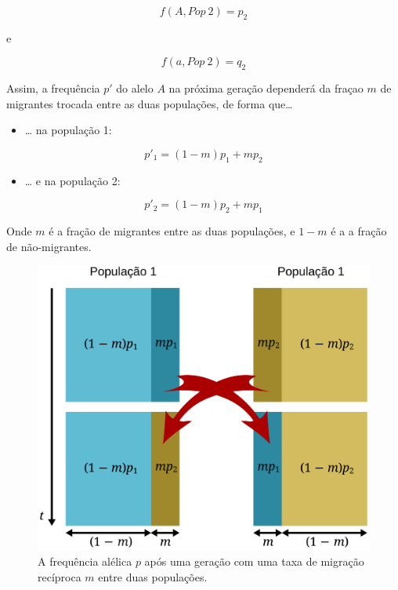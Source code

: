 \documentclass[
]{book}
\providecommand{\tightlist}{%
  \setlength{\itemsep}{0pt}\setlength{\parskip}{0pt}}
\begin{document}
\[f(A,Pop\ 2) = p_2\]

e

\[f(a,Pop\ 2) = q_2\]

Assim, a frequência \(p'\) do alelo \(A\) na próxima geração dependerá da fraçao \(m\) de migrantes trocada entre as duas populações, de forma que\ldots{}

\begin{itemize}
\tightlist
\item
  \ldots{} na população 1:
\end{itemize}

\[p'_1 = (1-m)p_1 + mp_2\]

\begin{itemize}
\tightlist
\item
  \ldots{} e na população 2:
\end{itemize}

\[p'_2 = (1-m)p_2 + mp_1\]

Onde
\(m\) é a fração de migrantes entre as duas populações, e
\(1-m\) é a a fração de não-migrantes.

\begin{figure}

{\centering \includegraphics[width=600px]{figs/migration_bidirectional} 

}

\caption{A frequência alélica $p$ após uma geração com uma taxa de migração recíproca $m$ entre duas populações.}\label{fig:migration2way}
\end{figure}
\end{document}
